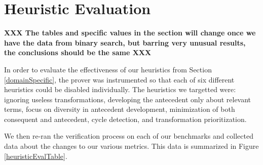 \FloatBarrier
\section{Heuristic Evaluation\label{heuristicsEval}}
\textbf{XXX The tables and specific values in the section will change once we have the data from binary search, but barring very unusual results, the conclusions should be the same XXX}

In order to evaluate the effectiveness of our heuristics from Section \ref{domainSpecific}, the prover was instrumented so that each of six different heuristics could be disabled individually.  The heuristics we targetted were: ignoring useless transformations, developing the antecedent only about relevant terms, focus on diversity in antecedent development, minimization of both consequent and antecedent, cycle detection, and transformation prioritization.

We then re-ran the verification process on each of our benchmarks and collected data about the changes to our various metrics.  This data is summarized in Figure \ref{heuristicEvalTable}.

